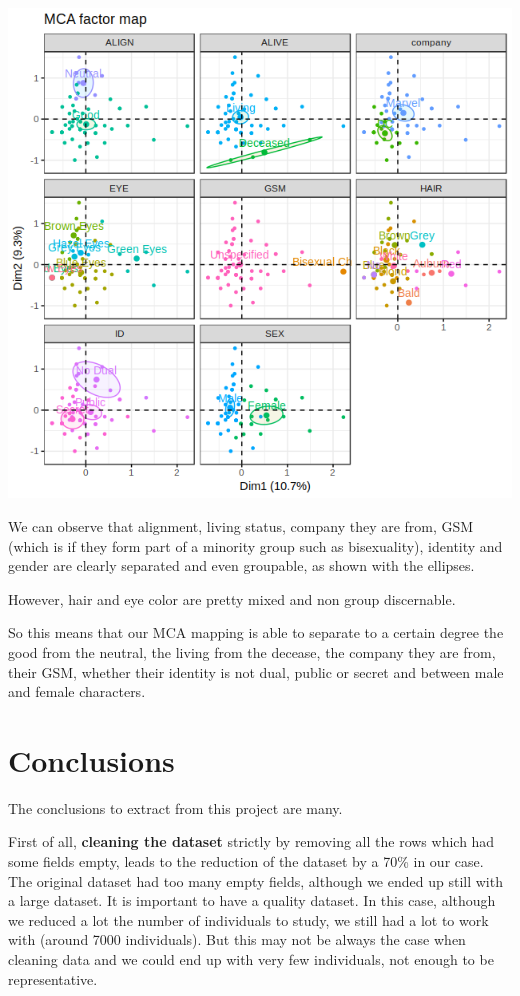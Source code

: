 \begin{center}
   \includegraphics[scale=0.7]{img/MCA_all_factors.png}
\end{center}

We can observe that alignment, living status, company they are from, GSM (which is if they form part of a minority group such as bisexuality), identity and gender are clearly separated and even groupable, as shown with the ellipses.

However, hair and eye color are pretty mixed and non group discernable.


So this means that our MCA mapping is able to separate to a certain degree the good from the neutral, the living from the decease, the company they are from, their GSM, whether their identity is not dual, public or secret and between male and female characters.


\newpage
\section{Conclusions}
The conclusions to extract from this project are many.


First of all, \textbf{cleaning the dataset} strictly by removing all the rows which had some fields empty, leads to the reduction of the dataset by a 70\% in our case. The original dataset had too many empty fields, although we ended up still with a large dataset. It is important to have a quality dataset. In this case, although we reduced a lot the number of individuals to study, we still had a lot to work with (around 7000 individuals). But this may not be always the case when cleaning data and we could end up with very few individuals, not enough to be representative.

